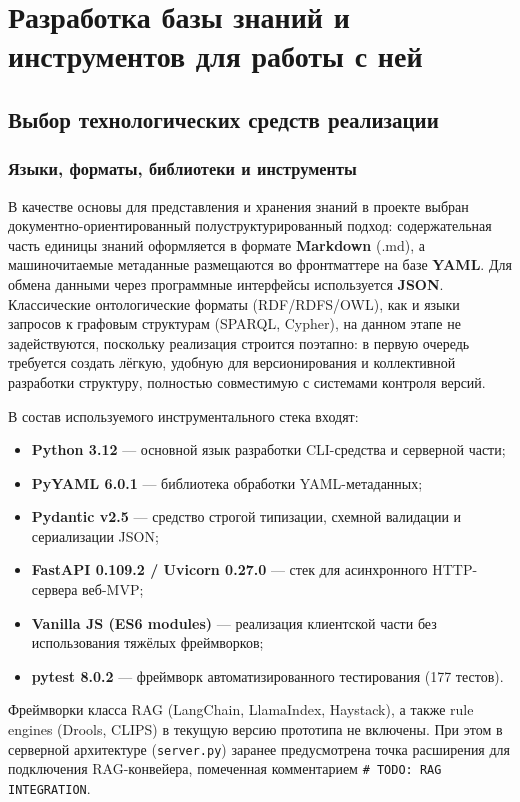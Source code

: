 \section{Разработка базы знаний и инструментов для работы с ней}
\label{sec:development}

\subsection{Выбор технологических средств реализации}

\subsubsection*{Языки, форматы, библиотеки и инструменты}

В качестве основы для представления и хранения знаний в проекте выбран документно-ориентированный полуструктурированный подход: содержательная часть единицы знаний оформляется в формате \textbf{Markdown} (.md), а машиночитаемые метаданные размещаются во фронтматтере на базе \textbf{YAML}. Для обмена данными через программные интерфейсы используется \textbf{JSON}. Классические онтологические форматы (RDF/RDFS/OWL), как и языки запросов к графовым структурам (SPARQL, Cypher), на данном этапе не задействуются, поскольку реализация строится поэтапно: в первую очередь требуется создать лёгкую, удобную для версионирования и коллективной разработки структуру, полностью совместимую с системами контроля версий.

В состав используемого инструментального стека входят:
\begin{itemize}
    \item \textbf{Python 3.12} — основной язык разработки CLI-средства и серверной части;
    \item \textbf{PyYAML 6.0.1} — библиотека обработки YAML-метаданных;
    \item \textbf{Pydantic v2.5} — средство строгой типизации, схемной валидации и сериализации JSON;
    \item \textbf{FastAPI 0.109.2 / Uvicorn 0.27.0} — стек для асинхронного HTTP-сервера веб-MVP;
    \item \textbf{Vanilla JS (ES6 modules)} — реализация клиентской части без использования тяжёлых фреймворков;
    \item \textbf{pytest 8.0.2} — фреймворк автоматизированного тестирования (177 тестов).
\end{itemize}

Фреймворки класса RAG (LangChain, LlamaIndex, Haystack), а также rule engines (Drools, CLIPS) в текущую версию прототипа не включены. При этом в серверной архитектуре (\texttt{server.py}) заранее предусмотрена точка расширения для подключения RAG-конвейера, помеченная комментарием \texttt{\# TODO: RAG INTEGRATION}.


